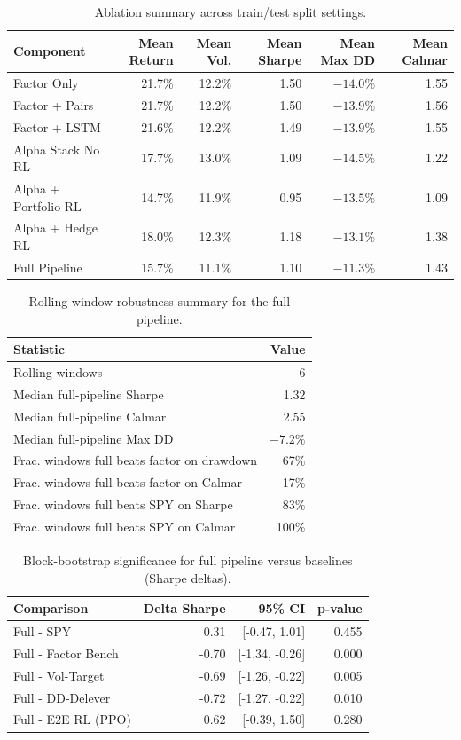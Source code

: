 \begin{table}[H]
\centering
\caption{Ablation summary across train/test split settings.}
\label{tab:ablation_summary}
\begin{tabular}{@{} l r r r r r @{}}
\toprule
Component & Mean Return & Mean Vol. & Mean Sharpe & Mean Max DD & Mean Calmar \\
\midrule
Factor Only & 21.7\% & 12.2\% & 1.50 & $-14.0\%$ & 1.55 \\
Factor + Pairs & 21.7\% & 12.2\% & 1.50 & $-13.9\%$ & 1.56 \\
Factor + LSTM & 21.6\% & 12.2\% & 1.49 & $-13.9\%$ & 1.55 \\
Alpha Stack No RL & 17.7\% & 13.0\% & 1.09 & $-14.5\%$ & 1.22 \\
Alpha + Portfolio RL & 14.7\% & 11.9\% & 0.95 & $-13.5\%$ & 1.09 \\
Alpha + Hedge RL & 18.0\% & 12.3\% & 1.18 & $-13.1\%$ & 1.38 \\
Full Pipeline & 15.7\% & 11.1\% & 1.10 & $-11.3\%$ & 1.43 \\
\bottomrule
\end{tabular}
\end{table}

\begin{table}[H]
\centering
\caption{Rolling-window robustness summary for the full pipeline.}
\label{tab:robustness_summary}
\begin{tabular}{@{} l r @{}}
\toprule
Statistic & Value \\
\midrule
Rolling windows & 6 \\
Median full-pipeline Sharpe & 1.32 \\
Median full-pipeline Calmar & 2.55 \\
Median full-pipeline Max DD & $-7.2\%$ \\
Frac. windows full beats factor on drawdown & 67\% \\
Frac. windows full beats factor on Calmar & 17\% \\
Frac. windows full beats SPY on Sharpe & 83\% \\
Frac. windows full beats SPY on Calmar & 100\% \\
\bottomrule
\end{tabular}
\end{table}

\begin{table}[H]
\centering
\caption{Block-bootstrap significance for full pipeline versus baselines (Sharpe deltas).}
\label{tab:bootstrap_significance}
\begin{tabular}{@{} l r r r @{}}
\toprule
Comparison & Delta Sharpe & 95\% CI & p-value \\
\midrule
Full - SPY & 0.31 & [-0.47, 1.01] & 0.455 \\
Full - Factor Bench & -0.70 & [-1.34, -0.26] & 0.000 \\
Full - Vol-Target & -0.69 & [-1.26, -0.22] & 0.005 \\
Full - DD-Delever & -0.72 & [-1.27, -0.22] & 0.010 \\
Full - E2E RL (PPO) & 0.62 & [-0.39, 1.50] & 0.280 \\
\bottomrule
\end{tabular}
\end{table}
